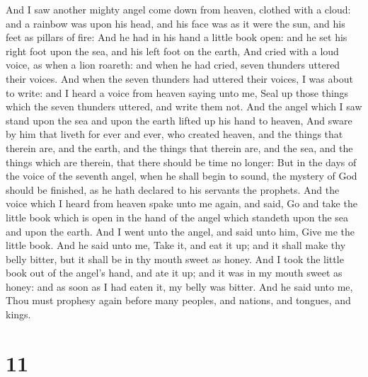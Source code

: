  And I saw another mighty angel come down from heaven,
clothed with a cloud: and a rainbow was upon his head, and his face was
as it were the sun, and his feet as pillars of fire:  And
he had in his hand a little book open: and he set his right foot upon
the sea, and his left foot on the earth,  And cried with a
loud voice, as when a lion roareth: and when he had cried, seven
thunders uttered their voices.  And when the seven
thunders had uttered their voices, I was about to write: and I heard a
voice from heaven saying unto me, Seal up those things which the seven
thunders uttered, and write them not.  And the angel which
I saw stand upon the sea and upon the earth lifted up his hand to
heaven,  And sware by him that liveth for ever and ever,
who created heaven, and the things that therein are, and the earth, and
the things that therein are, and the sea, and the things which are
therein, that there should be time no longer:  But in the
days of the voice of the seventh angel, when he shall begin to sound,
the mystery of God should be finished, as he hath declared to his
servants the prophets.  And the voice which I heard from
heaven spake unto me again, and said, Go and take the little book which
is open in the hand of the angel which standeth upon the sea and upon
the earth.  And I went unto the angel, and said unto him,
Give me the little book. And he said unto me, Take it, and eat it up;
and it shall make thy belly bitter, but it shall be in thy mouth sweet
as honey.  And I took the little book out of the angel's
hand, and ate it up; and it was in my mouth sweet as honey: and as soon
as I had eaten it, my belly was bitter.  And he said unto
me, Thou must prophesy again before many peoples, and nations, and
tongues, and kings.

\hypertarget{section-10}{%
\section{11}\label{section-10}}

